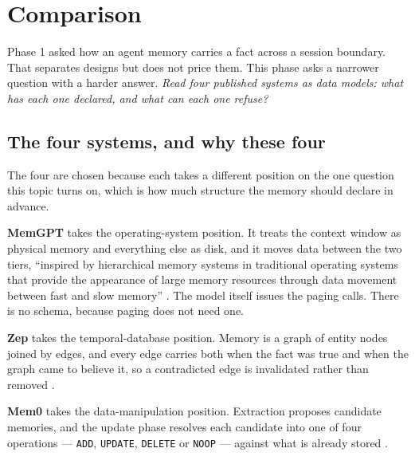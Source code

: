 \documentclass[11pt,a4paper]{article}
\newcommand{\code}[1]{\texttt{\small #1}}
\begin{document}
\clearpage
{\sffamily\setlength{\parskip}{0pt}%
 \tableofcontents
 \vspace{1.4\baselineskip}
 \listoffigures
 \vspace{1.2\baselineskip}
 \listoftables}
\clearpage

\setcounter{page}{1}

\section{Comparison}
\label{sec:cmp}

Phase 1 asked how an agent memory carries a fact across a session
boundary. That separates designs but does not price them. This phase asks
a narrower question with a harder answer. \emph{Read four published
systems as data models: what has each one declared, and what can each one
refuse?}

\subsection{The four systems, and why these four}

The four are chosen because each takes a different position on the one
question this topic turns on, which is how much structure the memory
should declare in advance.

\textbf{MemGPT} takes the operating-system position. It treats the
context window as physical memory and everything else as disk, and it
moves data between the two tiers, ``inspired by hierarchical memory
systems in traditional operating systems that provide the appearance of
large memory resources through data movement between fast and slow
memory'' \cite{memgpt}. The model itself issues the paging calls. There
is no schema, because paging does not need one.

\textbf{Zep} takes the temporal-database position. Memory is a graph of
entity nodes joined by edges, and every edge carries both when the fact
was true and when the graph came to believe it, so a contradicted edge is
invalidated rather than removed \cite{zep,graphiti}.

\textbf{Mem0} takes the data-manipulation position. Extraction proposes
candidate memories, and the update phase resolves each candidate into one
of four operations --- \code{ADD}, \code{UPDATE}, \code{DELETE} or
\code{NOOP} --- against what is already stored \cite{mem0}.
\end{document}
